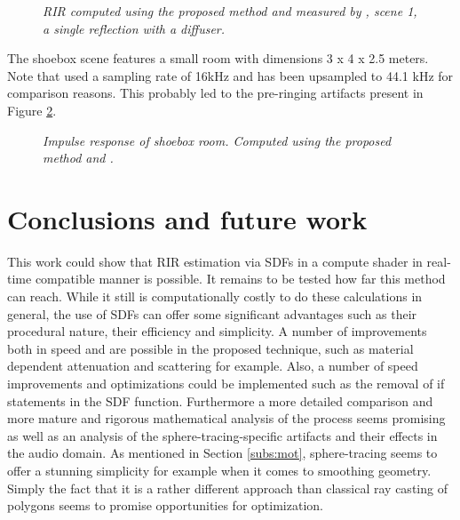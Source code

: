 \documentclass[twoside,a4paper]{article}
\begin{document}
\begin{figure}
    \begin{center}
      
    \end{center}
    
    \caption{\label{fig:diffuser} \it RIR computed using the proposed method and measured by \cite{brinkmann_round_2019}, scene 1, a single reflection with a diffuser.}
\end{figure}


The shoebox scene features a small room with dimensions 3 x 4 x 2.5 meters. Note that \cite{lehmann_fast_2020} used a sampling rate of 16kHz and has been upsampled to 44.1 kHz for comparison reasons. This probably led to the pre-ringing artifacts present in Figure \ref{fig:shoe}.

\begin{figure}
    \begin{center}
      
    \end{center}
    \caption{\label{fig:shoe} \it Impulse response of shoebox room. Computed using the proposed method and \cite{lehmann_fast_2020}. }
    
\end{figure}

\section{Conclusions and future work}
\label{sec:concl}

This work could show that RIR estimation via SDFs in a compute shader in real-time compatible manner is possible. It remains to be tested how far this method can reach. While it still is computationally costly to do these calculations in general, the use of SDFs can offer some significant advantages such as their procedural nature, their efficiency and simplicity. A number of improvements both in speed and are possible in the proposed technique, such as material dependent attenuation and scattering for example. Also, a number of speed improvements and optimizations could be implemented such as the removal of if statements in the SDF function. Furthermore a more detailed comparison and more mature and rigorous mathematical analysis of the process seems promising as well as an analysis of the sphere-tracing-specific artifacts and their effects in the audio domain. As mentioned in Section \ref{subs:mot}, sphere-tracing seems to offer a stunning simplicity for example when it comes to smoothing geometry. Simply the fact that it is a rather different approach than classical ray casting of polygons seems to promise opportunities for optimization. 
\end{document}
